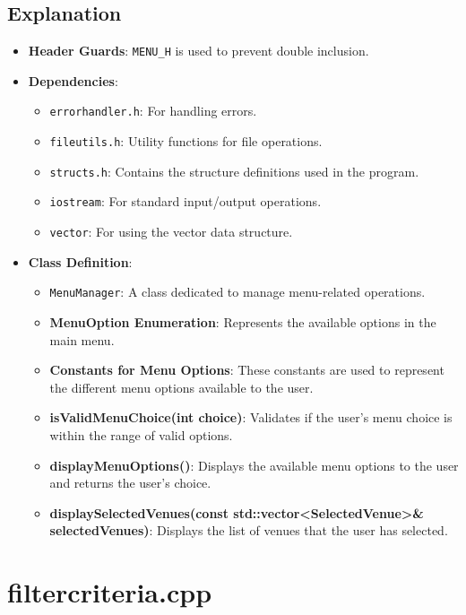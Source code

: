 \documentclass{article}
\begin{document}
	\subsection*{Explanation}
	\begin{itemize}
		\item \textbf{Header Guards}: \texttt{MENU\_H} is used to prevent double inclusion.
		\item \textbf{Dependencies}:
		\begin{itemize}
			\item \texttt{errorhandler.h}: For handling errors.
			\item \texttt{fileutils.h}: Utility functions for file operations.
			\item \texttt{structs.h}: Contains the structure definitions used in the program.
			\item \texttt{iostream}: For standard input/output operations.
			\item \texttt{vector}: For using the vector data structure.
		\end{itemize}
		\item \textbf{Class Definition}:
		\begin{itemize}
			\item \texttt{MenuManager}: A class dedicated to manage menu-related operations.
			\item \textbf{MenuOption Enumeration}: Represents the available options in the main menu.
			\item \textbf{Constants for Menu Options}: These constants are used to represent the different menu options available to the user.
			\item \textbf{isValidMenuChoice(int choice)}: Validates if the user's menu choice is within the range of valid options.
			\item \textbf{displayMenuOptions()}: Displays the available menu options to the user and returns the user's choice.
			\item \textbf{displaySelectedVenues(const std::vector<SelectedVenue>\& selectedVenues)}: Displays the list of venues that the user has selected.
		\end{itemize}
	\end{itemize}
	
	\section{filtercriteria.cpp}
	
\end{document}
